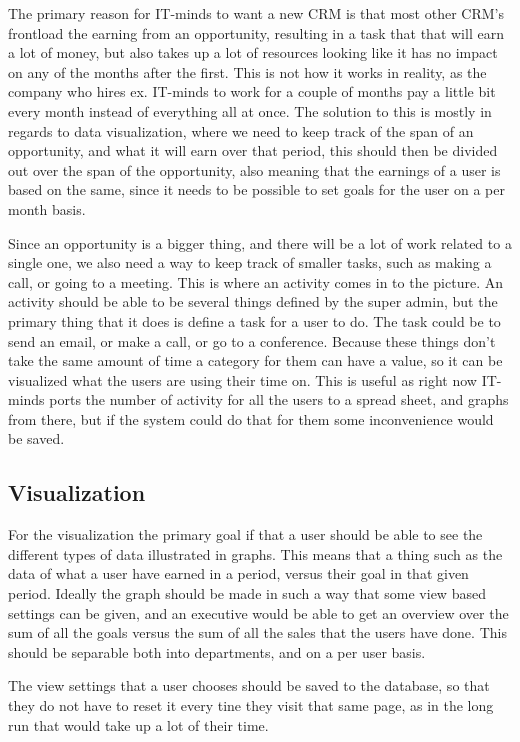 The primary reason for IT-minds to want a new CRM is that most other CRM's frontload the earning from an opportunity, resulting in a task that that will earn a lot of money, but also takes up a lot of resources looking like it has no impact on any of the months after the first. This is not how it works in reality, as the company who hires ex. IT-minds to work for a couple of months pay a little bit every month instead of everything all at once. The solution to this is mostly in regards to data visualization, where we need to keep track of the span of an opportunity, and what it will earn over that period, this should then be divided out over the span of the opportunity, also meaning that the earnings of a user is based on the same, since it needs to be possible to set goals for the user on a per month basis.

Since an opportunity is a bigger thing, and there will be a lot of work related to a single one, we also need a way to keep track of smaller tasks, such as making a call, or going to a meeting. This is where an activity comes in to the picture. An activity should be able to be several things defined by the super admin, but the primary thing that it does is define a task for a user to do. The task could be to send an email, or make a call, or go to a conference. Because these things don't take the same amount of time a category for them can have a value, so it can be visualized what the users are using their time on. This is useful as right now IT-minds ports the number of activity for all the users to a spread sheet, and graphs from there, but if the system could do that for them some inconvenience would be saved.

\subsection{Visualization}
\label{sub:Visualization}
For the visualization the primary goal if that a user should be able to see the different types of data illustrated in graphs. This means that a thing such as the data of what a user have earned in a period, versus their goal in that given period. Ideally the graph should be made in such a way that some view based settings can be given, and an executive would be able to get an overview over the sum of all the goals versus the sum of all the sales that the users have done. This should be separable both into departments, and on a per user basis.

The view settings that a user chooses should be saved to the database, so that they do not have to reset it every tine they visit that same page, as in the long run that would take up a lot of their time.

